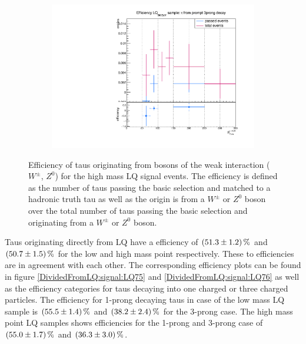 \begin{figure}
\begin{subfigure}[t]{0.49\textwidth}
                \label{Dividedprompt:signal:1prongLQ76}
                \end{subfigure}
                \begin{subfigure}[t]{0.49\textwidth}
                \includegraphics[width=\textwidth]{figures/plots/LQ76/Divided_prompt3prong.pdf}
                \label{Dividedprompt:signal:3prongLQ76}
                \end{subfigure}            
\caption[Efficiency of taus originating from bosons of the weak interaction ($W^\pm$, $Z^0$) for the high mass LQ signal events.]{Efficiency of taus originating from bosons of the weak interaction ($W^\pm$, $Z^0$) for the high mass LQ signal events. The efficiency is defined as the number of taus passing the basic selection and matched to a hadronic truth tau as well as the origin is from a $W^\pm$ or $Z^0$ boson over the total number of taus passing the basic selection and originating from a $W^\pm$ or $Z^0$ boson.}
\label{Dividedprompt:signal:LQ76}
\end{figure}
%
Taus originating directly from LQ have a efficiency of $\SI{51.3\pm 1.2}{\percent}$ and $\SI{50.7\pm 1.5}{\percent}$ for the low and high mass point respectively. These to efficiencies are in agreement with each other. The corresponding efficiency plots can be found in figure \ref{DividedFromLQ:signal:LQ75} and \ref{DividedFromLQ:signal:LQ76} as well as the efficiency categories for taus decaying into one charged or three charged particles. The efficiency for 1-prong decaying taus in case of the low mass LQ sample is $\SI{55.5\pm 1.4}{\percent}$ and $\SI{38.2\pm 2.4}{\percent}$ for the 3-prong case. The high mass point LQ samples shows efficiencies for the 1-prong and 3-prong case of $\SI{55.0\pm 1.7}{\percent}$ and $\SI{36.3\pm 3.0}{\percent}$.\par
